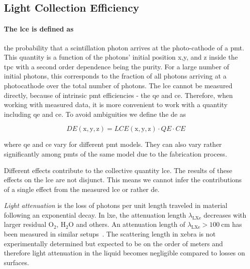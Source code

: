 
\FloatBarrier
\subsection{Light Collection Efficiency}
\label{ssec:lce}
\FloatBarrier



\paragraph{The \gls{lce} is defined as} the probability that a scintillation photon arrives at the photo-cathode of a \gls{pmt}.
This quantity is a function of the photons' initial position x,y, and z inside the \gls{tpc} with a second order dependence being the purity.
For a large number of initial photons, this corresponds to the fraction of all photons arriving at a photocathode over the total number of photons.
The \gls{lce} cannot be measured directly, because of intrinsic \gls{pmt} efficiencies - the \gls{qe} and \gls{ce}.
Therefore, when working with measured data, it is more convenient to work with a quantity including \gls{qe} and \gls{ce}.
To avoid ambiguities we define the \gls{de} as


\begin{equation}
    \mathit{DE}\left(\mathrm{x}, \mathrm{y}, \mathrm{z}\right) =  \mathit{LCE}\left(\mathrm{x}, \mathrm{y}, \mathrm{z}\right) \cdot \mathit{QE} \cdot \mathit{CE}
\end{equation}

where \gls{qe} and \gls{ce} vary for different \gls{pmt} models.
They can also vary rather significantly among \glspl{pmt} of the same model due to the fabrication process.

Different effects contribute to the collective quantity \gls{lce}.
The results of these effects on the \gls{lce} are not disjunct.
This means we cannot infer the contributions of a single effect from the measured \gls{lce} or rather \gls{de}.

\emph{Light attenuation} is the loss of photons per unit length traveled in material following an exponential decay.
In \gls{lxe}, the attenuation length $ \lambda_\mathrm{LXe} $ decreases with larger residual $ \mathrm{O}_2 $, $ \mathrm{H}_2\mathrm{O} $ and others.
An attenuation length of $ \lambda_\mathrm{LXe} > \SI{100}{\centi\m} $ has been measured in similar setups~\cite{Baldini05}.
The scattering length in \gls{xebra} is not experimentally determined but expected to be on the order of meters and therefore light attenuation in the liquid becomes negligible compared to losses on surfaces.

